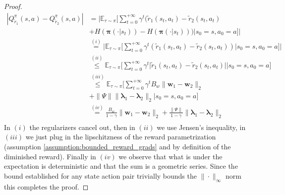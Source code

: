 \begin{lemma}
\begin{proof}
        \begin{align*}
            |Q_{\tilde{r}_1}^\pi(s,a) - Q_{\tilde{r}_2}^\pi(s,a)|
            &=
            \Bigg|
            \mathbb{E}_{\tau \sim \pi}\Bigg[ 
                \sum_{t=0}^{+\infty} \gamma^t (\tilde{r}_1(s_t,a_t)-\tilde{r}_2(s_t,a_t)\\ &+H(\bm{\pi}(\cdot|s_t))-H(\bm{\pi}(\cdot|s_t))) 
                \Bigg| s_0 =s, a_0 = a
            \Bigg]
            \Bigg|\\
            &\stackrel{(i)}{=}
            \Bigg|
            \mathbb{E}_{\tau \sim \pi}\Bigg[ 
                \sum_{t=0}^{+\infty} \gamma^t (\tilde{r}_1(s_t,a_t)-\tilde{r}_2(s_t,a_t))
                \Bigg| s_0 =s, a_0 = a
            \Bigg]
            \Bigg|\\
            &\stackrel{(ii)}{\leq}
            \mathbb{E}_{\tau \sim \pi}\Bigg[ 
                \sum_{t=0}^{+\infty} \gamma^t 
                \big|
                \tilde{r}_1(s_t,a_t)-\tilde{r}_2(s_t,a_t)
                \big|
                \Bigg| s_0 =s, a_0 = a
            \Bigg]
            \\
            &\stackrel{(iii)}{\leq}
            \mathbb{E}_{\tau \sim \pi}\Bigg[ 
                \sum_{t=0}^{+\infty} \gamma^t 
                B_w \|\bm{w}_1-\bm{w}_2\|_2 \\ &
                + \|\Psi\| \|\bm{\lambda}_1-\bm{\lambda}_2\|_2 
                \Bigg| s_0 =s, a_0 = a
            \Bigg]
            \\
            &\stackrel{(iv)}{=}
                \frac{B_w}{1-\gamma} \|\bm{w}_1-\bm{w}_2\|_2 
                + \frac{\|\Psi\|}{1-\gamma} \|\bm{\lambda}_1-\bm{\lambda}_2\|_2 
            \\
        \end{align*}
        In $(i)$ the regularizers cancel out, then in $(ii)$ we use Jensen's inequality, in $(iii)$ we just plug in the lipschitzness of the reward parametrization (assumption \ref{assumption:bounded_reward_grads} and by definition of the diminished reward). Finally  in $(iv)$ we observe that what is under the expectation is deterministic and that the sum is a geometric series. Since the bound established for any state action pair trivially bounds the $\|\cdot\|_\infty$ norm this completes the proof.
    \end{proof}
\end{lemma}

